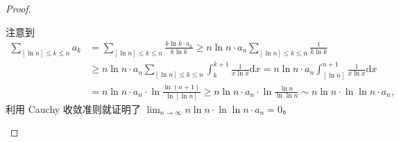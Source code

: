\documentclass[../../main.tex]{subfiles}
\begin{document}
\begin{proof}
\begin{enumerate}
注意到
\begin{align*}
\sum_{[\ln n] \leqslant k \leqslant n} a_k &= \sum_{[\ln n] \leqslant k \leqslant n} \frac{k \ln k \cdot a_k}{k \ln k} \geqslant n \ln n \cdot a_n \sum_{[\ln n] \leqslant k \leqslant n} \frac{1}{k \ln k} \\
&\geqslant n \ln n \cdot a_n \sum_{[\ln n] \leqslant k \leqslant n} \int_{k}^{k + 1} \frac{1}{x \ln x} \mathrm{d}x = n \ln n \cdot a_n \int_{[\ln n]}^{n + 1} \frac{1}{x \ln x} \mathrm{d}x \\
&= n \ln n \cdot a_n \cdot \ln \frac{\ln (n + 1)}{\ln [\ln n]} \geqslant n \ln n \cdot a_n \cdot \ln \frac{\ln n}{\ln \ln n} \sim n \ln n \cdot \ln \ln n \cdot a_n,
\end{align*}
利用 Cauchy 收敛准则就证明了 \( \lim_{n \to \infty} n \ln n \cdot \ln \ln n \cdot a_n = 0 \)。
\end{enumerate}

\end{proof}
\end{document}
